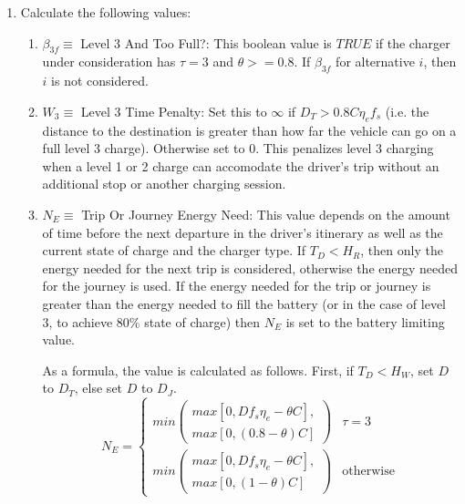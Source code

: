 \documentclass[journal]{IEEEtran}
\begin{document}
\begin{enumerate}[label=(\alph*)]
  \item Calculate the following values: 
  \begin{enumerate}[label=(\roman*)]
    \item $\beta_{3f} \equiv$ Level 3 And Too Full?: This boolean value is $TRUE$ if the charger under consideration has $\tau = 3$ and $\theta >= 0.8$. If $\beta_{3f}$ for alternative $i$, then $i$ is not considered.
    \item $W_3 \equiv$ Level 3 Time Penalty: Set this to $\infty$ if $D_T > 0.8 C \eta_e f_s$ (i.e. the distance to the destination is greater than how far the vehicle can go on a full level 3 charge). Otherwise set to 0.  This penalizes level 3 charging when a level 1 or 2 charge can accomodate the driver's trip without an additional stop or another charging session.
    \item $N_E \equiv$ Trip Or Journey Energy Need: This value depends on the amount of time before the next departure in the driver's itinerary as well as the current state of charge and the charger type.  If $T_D < H_R$, then only the energy needed for the next trip is considered, otherwise the energy needed for the journey is used.  If the energy needed for the trip or journey is greater than the energy needed to fill the battery (or in the case of level 3, to achieve 80\% state of charge) then $N_E$ is set to the battery limiting value.

    As a formula, the value is calculated as follows. First, if $T_D < H_W$, set $D$ to $D_T$, else set $D$ to $D_J$. 
    \begin{equation}
      N_E = 
      \begin{cases}
	min\left(\substack{ max\left[0,D f_s \eta_e - \theta C \right],\\
	max⁡\left[0,(0.8-\theta)C \right] }\right) & \tau = 3 \\
	min\left(\substack{max\left[0,D f_s \eta_e - \theta C \right],\\
	max⁡\left[0,(1-\theta)C \right] }\right) & \text{otherwise}
      \end{cases}
    \end{equation}
	  

\end{enumerate}
\end{enumerate}
\end{document}
